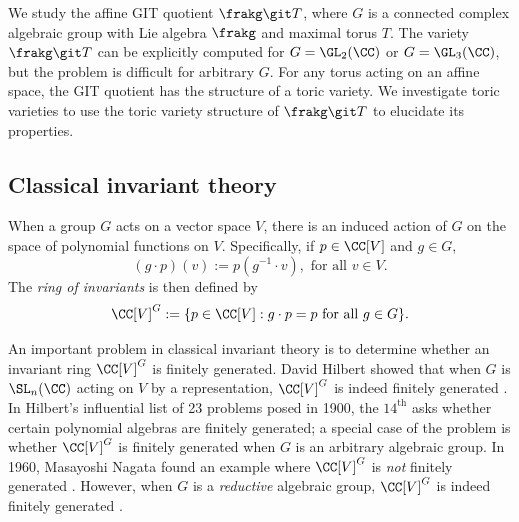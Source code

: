 \documentclass[12pt]{amsart}
\theoremstyle{plain}
\begin{document}
We study the affine GIT quotient $\frakg \git T$, where $G$ is a connected complex algebraic group with Lie algebra $\frakg$ and maximal torus $T$.
The variety $\frakg \git T$ can be explicitly computed for $G = \GL_2(\CC)$ or $G = \GL_3(\CC)$, but the problem is difficult for arbitrary $G$.
For any torus acting on an affine space, the GIT quotient has the structure of a toric variety.
We investigate toric varieties to use the toric variety structure of $\frakg \git T$ to elucidate its properties.


\subsection{Classical invariant theory}
When a group $G$ acts on a vector space $V$, there is an induced action of $G$ on the space of polynomial functions on $V$.
Specifically, if $p \in \CC[V]$ and $g \in G$,
$$(g \cdot p)(v) := p(g^{-1} \cdot v), \text{ for all } v \in V.$$
The \emph{ring of invariants} is then defined by
$$\CC[V]^G := \{p \in \CC[V] : g \cdot p = p \text{ for all } g \in G\}.$$



An important problem in classical invariant theory is to determine whether an invariant ring $\CC[V]^G$ is finitely generated.
David Hilbert showed that when $G$ is $\SL_n(\CC)$ acting on $V$ by a representation, $\CC[V]^G$ is indeed finitely generated \cite{Hilbert90}.
In Hilbert's influential list of 23 problems posed in 1900, the $14^\text{th}$ asks whether certain polynomial algebras are finitely generated;
a special case of the problem is whether $\CC[V]^G$ is finitely generated when $G$ is an arbitrary algebraic group.
In 1960, Masayoshi Nagata found an example where $\CC[V]^G$ is \emph{not} finitely generated \cite{Nagata60}.
However, when $G$ is a \emph{reductive} algebraic group, $\CC[V]^G$ is indeed finitely generated \cite[Theorem 4.51]{Mukai03}.
\end{document}
